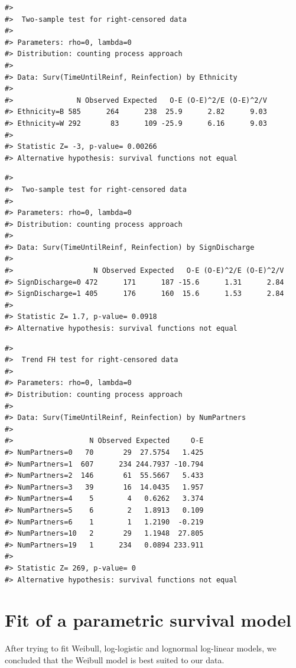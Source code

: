 \documentclass[
]{article}
\begin{document}
\begin{verbatim}
#> 
#>  Two-sample test for right-censored data
#> 
#> Parameters: rho=0, lambda=0
#> Distribution: counting process approach
#> 
#> Data: Surv(TimeUntilReinf, Reinfection) by Ethnicity
#> 
#>               N Observed Expected   O-E (O-E)^2/E (O-E)^2/V
#> Ethnicity=B 585      264      238  25.9      2.82      9.03
#> Ethnicity=W 292       83      109 -25.9      6.16      9.03
#> 
#> Statistic Z= -3, p-value= 0.00266
#> Alternative hypothesis: survival functions not equal
\end{verbatim}

\begin{verbatim}
#> 
#>  Two-sample test for right-censored data
#> 
#> Parameters: rho=0, lambda=0
#> Distribution: counting process approach
#> 
#> Data: Surv(TimeUntilReinf, Reinfection) by SignDischarge
#> 
#>                   N Observed Expected   O-E (O-E)^2/E (O-E)^2/V
#> SignDischarge=0 472      171      187 -15.6      1.31      2.84
#> SignDischarge=1 405      176      160  15.6      1.53      2.84
#> 
#> Statistic Z= 1.7, p-value= 0.0918
#> Alternative hypothesis: survival functions not equal
\end{verbatim}

\begin{verbatim}
#> 
#>  Trend FH test for right-censored data
#> 
#> Parameters: rho=0, lambda=0
#> Distribution: counting process approach
#> 
#> Data: Surv(TimeUntilReinf, Reinfection) by NumPartners
#> 
#>                  N Observed Expected     O-E
#> NumPartners=0   70       29  27.5754   1.425
#> NumPartners=1  607      234 244.7937 -10.794
#> NumPartners=2  146       61  55.5667   5.433
#> NumPartners=3   39       16  14.0435   1.957
#> NumPartners=4    5        4   0.6262   3.374
#> NumPartners=5    6        2   1.8913   0.109
#> NumPartners=6    1        1   1.2190  -0.219
#> NumPartners=10   2       29   1.1948  27.805
#> NumPartners=19   1      234   0.0894 233.911
#> 
#> Statistic Z= 269, p-value= 0
#> Alternative hypothesis: survival functions not equal
\end{verbatim}

\hypertarget{fit-of-a-parametric-survival-model}{%
\section{Fit of a parametric survival model}\label{fit-of-a-parametric-survival-model}}

After trying to fit Weibull, log-logistic and lognormal log-linear models, we concluded that the Weibull model is best suited to our data.
\end{document}
